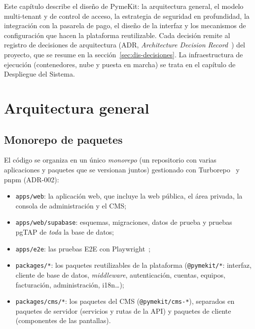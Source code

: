 
Este capítulo describe el diseño de PymeKit: la arquitectura general, el
modelo multi-tenant y de control de acceso, la estrategia de seguridad en
profundidad, la integración con la pasarela de pago, el diseño de la interfaz
y los mecanismos de configuración que hacen la plataforma reutilizable. Cada
decisión remite al registro de decisiones de arquitectura (ADR,
\textit{Architecture Decision Record}~\cite{nygard2011adr}) del proyecto, que
se resume en la sección~\ref{sec:dis-decisiones}. La infraestructura de
ejecución (contenedores, nube y puesta en marcha) se trata en el capítulo de
Despliegue del Sistema.

\section{Arquitectura general}
\label{sec:dis-arquitectura}

\subsection{Monorepo de paquetes}
\label{sec:dis-monorepo}

El código se organiza en un único \textit{monorepo} (un repositorio con
varias aplicaciones y paquetes que se versionan juntos) gestionado con
Turborepo~\cite{turborepo} y pnpm (ADR-002):

\begin{itemize}
  \item \texttt{apps/web}: la aplicación web, que incluye la web pública, el
        área privada, la consola de administración y el CMS;
  \item \texttt{apps/web/supabase}: esquemas, migraciones, datos de prueba y
        pruebas pgTAP de \emph{toda} la base de datos;
  \item \texttt{apps/e2e}: las pruebas E2E con Playwright~\cite{playwright};
  \item \texttt{packages/*}: los paquetes reutilizables de la plataforma
        (\texttt{@pymekit/*}: interfaz, cliente de base de datos,
        \textit{middleware}, autenticación, cuentas, equipos, facturación,
        administración, i18n\ldots);
  \item \texttt{packages/cms/*}: los paquetes del CMS
        (\texttt{@pymekit/cms-*}), separados en paquetes de servidor
        (servicios y rutas de la API) y paquetes de cliente (componentes de
        las pantallas).
\end{itemize}

